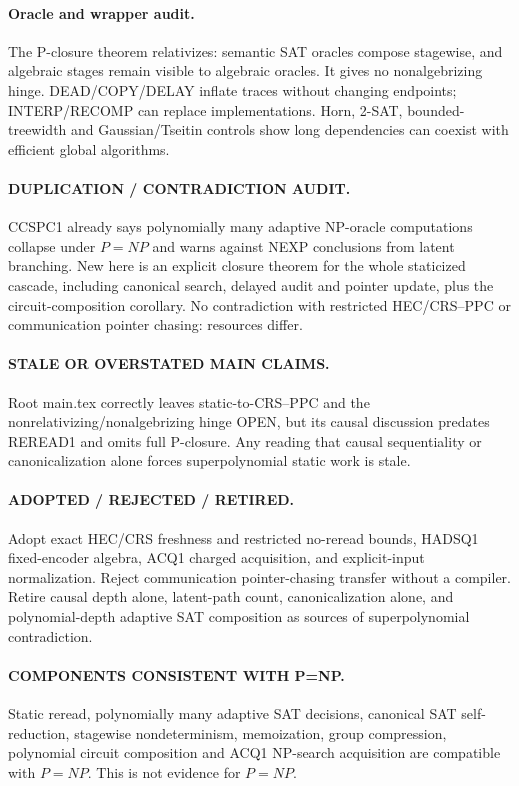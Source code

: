 \documentclass[11pt]{article}
\begin{document}
\paragraph{Oracle and wrapper audit.} The P-closure theorem relativizes: semantic SAT oracles compose stagewise, and algebraic stages remain visible to algebraic oracles. It gives no nonalgebrizing hinge. DEAD/COPY/DELAY inflate traces without changing endpoints; INTERP/RECOMP can replace implementations. Horn, 2-SAT, bounded-treewidth and Gaussian/Tseitin controls show long dependencies can coexist with efficient global algorithms.
\paragraph{DUPLICATION / CONTRADICTION AUDIT.} CCSPC1 already says polynomially many adaptive NP-oracle computations collapse under \(P=NP\) and warns against NEXP conclusions from latent branching. New here is an explicit closure theorem for the whole staticized cascade, including canonical search, delayed audit and pointer update, plus the circuit-composition corollary. No contradiction with restricted HEC/CRS--PPC or communication pointer chasing: resources differ.
\paragraph{STALE OR OVERSTATED MAIN CLAIMS.} Root main.tex correctly leaves static-to-CRS--PPC and the nonrelativizing/nonalgebrizing hinge OPEN, but its causal discussion predates REREAD1 and omits full P-closure. Any reading that causal sequentiality or canonicalization alone forces superpolynomial static work is stale.
\paragraph{ADOPTED / REJECTED / RETIRED.} Adopt exact HEC/CRS freshness and restricted no-reread bounds, HADSQ1 fixed-encoder algebra, ACQ1 charged acquisition, and explicit-input normalization. Reject communication pointer-chasing transfer without a compiler. Retire causal depth alone, latent-path count, canonicalization alone, and polynomial-depth adaptive SAT composition as sources of superpolynomial contradiction.
\paragraph{COMPONENTS CONSISTENT WITH P=NP.} Static reread, polynomially many adaptive SAT decisions, canonical SAT self-reduction, stagewise nondeterminism, memoization, group compression, polynomial circuit composition and ACQ1 NP-search acquisition are compatible with \(P=NP\). This is not evidence for \(P=NP\).
\end{document}
